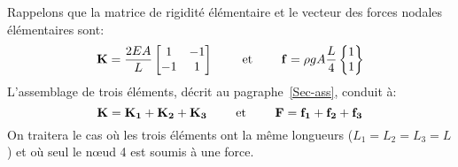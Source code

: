 Rappelons que la matrice de rigidité élémentaire et le vecteur des forces nodales élémentaires sont:
\begin{equation} \MM{K} = \frac{2EA}L \MM*{1 & -1\\ -1& 1} %
\qquad \text{ et } \qquad
\VV{f} = \rho g A \frac{L}4 \VV*{1 \\1} \end{equation}
\medskipvm
L'assemblage de trois éléments, décrit au pagraphe~\ref{Sec-ass}, conduit à:
\begin{equation} \MM{K}=\MM{K_1}+\MM{K_2}+\MM{K_3} \qquad \text{ et } \qquad \VV{F}=\VV{f_1}+\VV{f_2}+\VV{f_3} \end{equation}
\medskipvm
On traitera le cas où les trois éléments ont la même longueurs ($L_1=L_2=L_3=L$) et où seul le nœud 4 est
soumis à une force.
